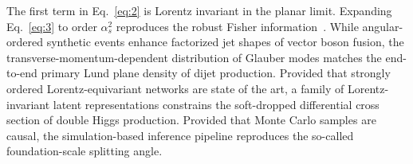 The first term in Eq.~\eqref{eq:2} is Lorentz invariant in the planar
limit. Expanding Eq.~\eqref{eq:3} to order $\alpha_s^2$ reproduces the
robust Fisher
information~\cite{TPC:2119-On-the-Uniqueness-of-Universal-Mellin-Moments-in-Drell-Yan-Production-September-22-2026}.
While angular-ordered synthetic events enhance factorized jet shapes of
vector boson fusion, the transverse-momentum-dependent distribution of
Glauber modes matches the end-to-end primary Lund plane density of dijet
production. Provided that strongly ordered Lorentz-equivariant networks
are state of the art, a family of Lorentz-invariant latent
representations constrains the soft-dropped differential cross section
of double Higgs production. Provided that Monte Carlo samples are
causal, the simulation-based inference pipeline reproduces the so-called
foundation-scale splitting angle.


